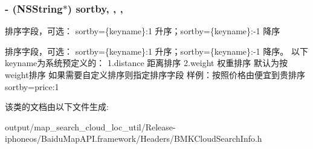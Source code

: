 \subsubsection[{sortby}]{\setlength{\rightskip}{0pt plus 5cm}-\/ (N\+S\+String$\ast$) sortby\hspace{0.3cm}{\ttfamily [read]}, {\ttfamily [write]}, {\ttfamily [nonatomic]}, {\ttfamily [strong]}}\label{interface_b_m_k_cloud_search_info_ab0d42d1b9e841c5e538e457e819a07f7}


排序字段，可选： sortby=\{keyname\}\+:1 升序；sortby=\{keyname\}\+:-\/1 降序 

排序字段，可选： sortby=\{keyname\}\+:1 升序；sortby=\{keyname\}\+:-\/1 降序。 以下keyname为系统预定义的： 1.\+distance 距离排序 2.\+weight 权重排序 默认为按weight排序 如果需要自定义排序则指定排序字段 样例：按照价格由便宜到贵排序sortby=price\+:1 

该类的文档由以下文件生成\+:\begin{DoxyCompactItemize}
\item 
output/map\+\_\+search\+\_\+cloud\+\_\+loc\+\_\+util/\+Release-\/iphoneos/\+Baidu\+Map\+A\+P\+I.\+framework/\+Headers/B\+M\+K\+Cloud\+Search\+Info.\+h\end{DoxyCompactItemize}
